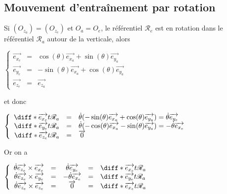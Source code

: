 \documentclass[a4paper,10pt]{book} %
\begin{document}
\newpage

\subsection{Mouvement d’entraînement par rotation}
Si $(O_{z_a})=(O_{z_{e}})$ et $O_a=O_e$, le référentiel $\mathcal{R}_e$ est en rotation dans le référentiel $\mathcal{R}_a$ autour de la verticale, alors 
\begin{center}$\left\{\begin{array}{rcl} 
\overrightarrow{e_{x_e}} &=&\cos(\theta)\overrightarrow{e_{x_a}} +\sin(\theta)\overrightarrow{e_{y_a}}\\
\overrightarrow{e_{y_e}} &=&-\sin(\theta)\overrightarrow{e_{x_a}} +\cos(\theta)\overrightarrow{e_{y_a}}\\
\overrightarrow{e_{z_e}} &=&\overrightarrow{e_{z_a}}
\end{array}\right.$\end{center}

et donc 
\begin{center}$\left\{\begin{array}{rcl}
\diff*{\overrightarrow{e_{x_e}}}{t}{\mathcal{R}_a}&=&\dot{\theta}(-\sin(\theta)\overrightarrow{e_{x_a}} +\cos(\theta)\overrightarrow{e_{y_a}})=\dot{\theta}\overrightarrow{e_{y_e}}\\
\diff*{\overrightarrow{e_{y_e}}}{t}{\mathcal{R}_a}&=&\dot{\theta}(-\cos(\theta)\overrightarrow{e_{x_a}} -\sin(\theta)\overrightarrow{e_{y_a}})=-\dot{\theta}\overrightarrow{e_{x_e}}\\
\diff*{\overrightarrow{e_{z_e}}}{t}{\mathcal{R}_a}&=&\overrightarrow{0}
\end{array}\right.$\end{center}

\bigskip

Or on a
\begin{center}$\left\{\begin{array}{rcccl}
\dot{\theta}\overrightarrow{e_{z_e}}\times \overrightarrow{e_{x_e}} &=&\dot{\theta}\overrightarrow{e_{y_e}} &=&\diff*{\overrightarrow{e_{x_e}}}{t}{\mathcal{R}_a}\\
\dot{\theta}\overrightarrow{e_{z_e}}\times \overrightarrow{e_{y_e}} &=&-\dot{\theta}\overrightarrow{e_{x_e}} &=&\diff*{\overrightarrow{e_{y_e}}}{t}{\mathcal{R}_a}\\
\dot{\theta}\overrightarrow{e_{z_e}}\times \overrightarrow{e_{z_e}} &=&\overrightarrow{0} &=&\diff*{\overrightarrow{e_{x_e}}}{t}{\mathcal{R}_a}
\end{array}\right.$\end{center}
\end{document}
